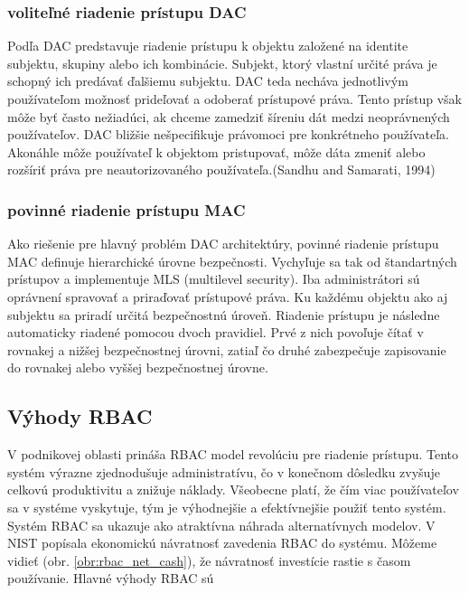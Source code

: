 
\subsubsection{voliteľné riadenie prístupu DAC}
Podľa \cite{TSCES} DAC predstavuje riadenie prístupu k objektu založené na identite subjektu, skupiny alebo ich kombinácie. Subjekt, ktorý vlastní určité práva je schopný ich predávať  ďalšiemu subjektu. DAC teda necháva jednotlivým používateľom možnosť prideľovať a odoberať prístupové práva. Tento prístup však môže byť často nežiadúci, ak chceme zamedziť šíreniu dát medzi neoprávnených používateľov. DAC bližšie nešpecifikuje právomoci pre konkrétneho používateľa. Akonáhle môže používateľ k objektom pristupovať, môže dáta zmeniť alebo rozšíriť práva pre neautorizovaného používateľa.(Sandhu and Samarati, 1994)


\subsubsection{povinné riadenie prístupu MAC}
Ako riešenie pre hlavný problém DAC architektúry, povinné riadenie prístupu MAC definuje hierarchické úrovne bezpečnosti. Vychyľuje sa tak od štandartných prístupov a implementuje MLS (multilevel security).  Iba administrátori sú oprávnení  spravovať a priraďovať prístupové práva. Ku každému objektu ako aj subjektu sa priradí určitá bezpečnostnú úroveň. Riadenie prístupu je následne automaticky riadené pomocou dvoch pravidiel. Prvé z nich povoľuje  čítať v rovnakej a nižšej bezpečnostnej úrovni, zatiaľ čo druhé zabezpečuje zapisovanie do rovnakej alebo vyššej bezpečnostnej úrovne. \cite{MAC}



\subsection{Výhody RBAC}
V podnikovej oblasti prináša RBAC model revolúciu pre riadenie prístupu. Tento systém výrazne zjednodušuje administratívu, čo v konečnom dôsledku zvyšuje celkovú produktivitu a znižuje náklady.  Všeobecne platí, že čím viac používateľov sa v systéme vyskytuje, tým je výhodnejšie a efektívnejšie použiť tento systém. Systém RBAC sa ukazuje ako atraktívna náhrada alternatívnych modelov. V \cite{ekonomika} NIST popísala ekonomickú návratnosť zavedenia RBAC do systému. Môžeme vidieť (obr. \ref{obr:rbac_net_cash}), že návratnosť investície rastie s časom používanie. Hlavné výhody RBAC sú

